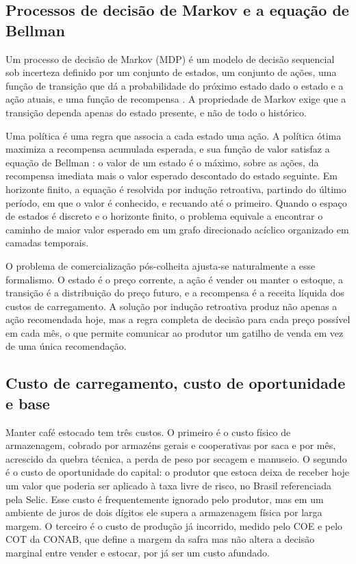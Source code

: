\subsection{Processos de decisão de Markov e a equação de Bellman}

Um processo de decisão de Markov (MDP) é um modelo de decisão sequencial sob incerteza definido por um conjunto de estados, um conjunto de ações, uma função de transição que dá a probabilidade do próximo estado dado o estado e a ação atuais, e uma função de recompensa \cite{Puterman1994}. A propriedade de Markov exige que a transição dependa apenas do estado presente, e não de todo o histórico.

Uma política é uma regra que associa a cada estado uma ação. A política ótima maximiza a recompensa acumulada esperada, e sua função de valor satisfaz a equação de Bellman \cite{Bellman1957}: o valor de um estado é o máximo, sobre as ações, da recompensa imediata mais o valor esperado descontado do estado seguinte. Em horizonte finito, a equação é resolvida por indução retroativa, partindo do último período, em que o valor é conhecido, e recuando até o primeiro. Quando o espaço de estados é discreto e o horizonte finito, o problema equivale a encontrar o caminho de maior valor esperado em um grafo direcionado acíclico organizado em camadas temporais.

O problema de comercialização pós-colheita ajusta-se naturalmente a esse formalismo. O estado é o preço corrente, a ação é vender ou manter o estoque, a transição é a distribuição do preço futuro, e a recompensa é a receita líquida dos custos de carregamento. A solução por indução retroativa produz não apenas a ação recomendada hoje, mas a regra completa de decisão para cada preço possível em cada mês, o que permite comunicar ao produtor um gatilho de venda em vez de uma única recomendação.

\subsection{Custo de carregamento, custo de oportunidade e base}

Manter café estocado tem três custos. O primeiro é o custo físico de armazenagem, cobrado por armazéns gerais e cooperativas por saca e por mês, acrescido da quebra técnica, a perda de peso por secagem e manuseio. O segundo é o custo de oportunidade do capital: o produtor que estoca deixa de receber hoje um valor que poderia ser aplicado à taxa livre de risco, no Brasil referenciada pela Selic. Esse custo é frequentemente ignorado pelo produtor, mas em um ambiente de juros de dois dígitos ele supera a armazenagem física por larga margem. O terceiro é o custo de produção já incorrido, medido pelo COE e pelo COT da CONAB, que define a margem da safra mas não altera a decisão marginal entre vender e estocar, por já ser um custo afundado.

